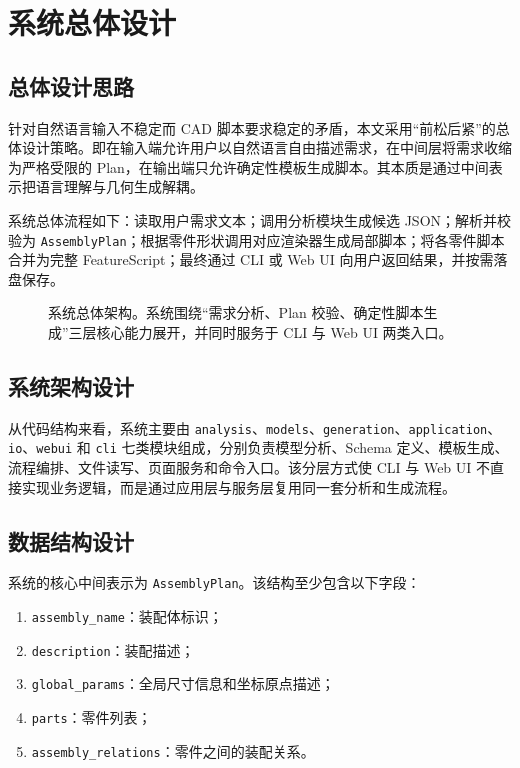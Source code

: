 \section{系统总体设计}

\subsection{总体设计思路}

针对自然语言输入不稳定而 CAD 脚本要求稳定的矛盾，本文采用“前松后紧”的总体设计策略。即在输入端允许用户以自然语言自由描述需求，在中间层将需求收缩为严格受限的 Plan，在输出端只允许确定性模板生成脚本。其本质是通过中间表示把语言理解与几何生成解耦。

系统总体流程如下：读取用户需求文本；调用分析模块生成候选 JSON；解析并校验为 \texttt{AssemblyPlan}；根据零件形状调用对应渲染器生成局部脚本；将各零件脚本合并为完整 FeatureScript；最终通过 CLI 或 Web UI 向用户返回结果，并按需落盘保存。

\begin{figure}[t]
  \centering
  \resizebox{0.98\linewidth}{!}{}
  \caption{系统总体架构。系统围绕“需求分析、Plan 校验、确定性脚本生成”三层核心能力展开，并同时服务于 CLI 与 Web UI 两类入口。}
  \label{fig:architecture}
\end{figure}

\subsection{系统架构设计}

从代码结构来看，系统主要由 \texttt{analysis}、\texttt{models}、\texttt{generation}、\texttt{application}、\texttt{io}、\texttt{webui} 和 \texttt{cli} 七类模块组成，分别负责模型分析、Schema 定义、模板生成、流程编排、文件读写、页面服务和命令入口。该分层方式使 CLI 与 Web UI 不直接实现业务逻辑，而是通过应用层与服务层复用同一套分析和生成流程。

\subsection{数据结构设计}

系统的核心中间表示为 \texttt{AssemblyPlan}。该结构至少包含以下字段：
\begin{enumerate}[leftmargin=2em]
  \item \texttt{assembly\_name}：装配体标识；
  \item \texttt{description}：装配描述；
  \item \texttt{global\_params}：全局尺寸信息和坐标原点描述；
  \item \texttt{parts}：零件列表；
  \item \texttt{assembly\_relations}：零件之间的装配关系。
\end{enumerate}

